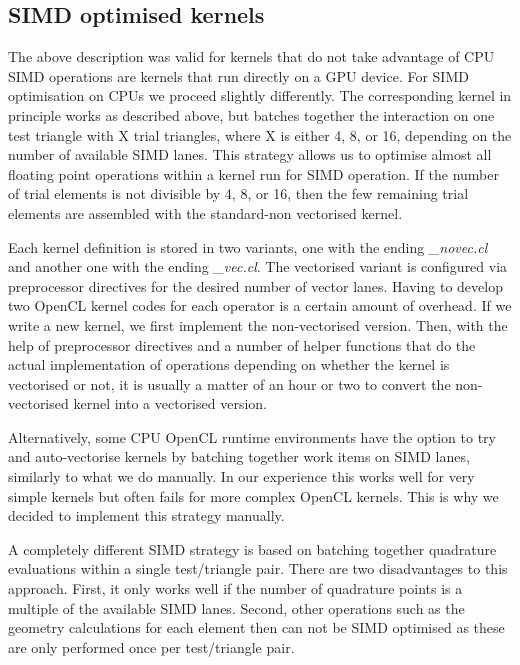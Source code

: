 \subsection{SIMD optimised kernels}

The above description was valid for kernels that do not take advantage of CPU SIMD operations are kernels that run directly on a GPU device. For SIMD optimisation on CPUs we proceed slightly differently. The corresponding kernel in principle works as described above, but batches together the interaction on one test triangle with X trial triangles, where X is either 4, 8, or 16, depending on the number of available SIMD lanes. This strategy allows us to optimise almost all floating point operations within a kernel run for SIMD operation. If the number of trial elements is not divisible by 4, 8, or 16, then the few remaining trial elements are assembled with the standard-non vectorised kernel.

Each kernel definition is stored in two variants, one with the ending \textit{\_novec.cl} and another one with the ending \textit{\_vec.cl}. The vectorised variant is configured via preprocessor directives for the desired number of vector lanes. Having to develop two OpenCL kernel codes for each operator is a certain amount of overhead. If we write a new kernel, we first implement the non-vectorised version. Then, with the help of preprocessor directives and a number of helper functions that do the actual implementation of operations depending on whether the kernel is vectorised or not, it is usually a matter of an hour or two to convert the non-vectorised kernel into a vectorised version.

Alternatively, some CPU OpenCL runtime environments have the option to try and auto-vectorise kernels by batching together work items on SIMD lanes, similarly to what we do manually. In our experience this works well for very simple kernels but often fails for more complex OpenCL kernels. This is why we decided to implement this strategy manually.

A completely different SIMD strategy is based on batching together quadrature evaluations within a single test/triangle pair. There are two disadvantages to this approach. First, it only works well if the number of quadrature points is a multiple of the available SIMD lanes. Second, other operations such as the geometry calculations for each element then can not be SIMD optimised as these are only performed once per test/triangle pair.
